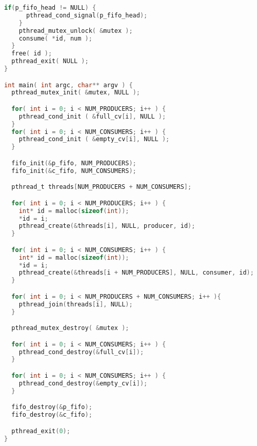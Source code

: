 \begin{lstlisting}[language=C]
    if(p_fifo_head != NULL) {
      pthread_cond_signal(p_fifo_head);
    }
    pthread_mutex_unlock( &mutex );
    consume( *id, num );
  }
  free( id );
  pthread_exit( NULL );
}

int main( int argc, char** argv ) {
  pthread_mutex_init( &mutex, NULL );

  for( int i = 0; i < NUM_PRODUCERS; i++ ) {
    pthread_cond_init ( &full_cv[i], NULL );
  }
  for( int i = 0; i < NUM_CONSUMERS; i++ ) {
    pthread_cond_init ( &empty_cv[i], NULL );
  }

  fifo_init(&p_fifo, NUM_PRODUCERS);
  fifo_init(&c_fifo, NUM_CONSUMERS);

  pthread_t threads[NUM_PRODUCERS + NUM_CONSUMERS];

  for( int i = 0; i < NUM_PRODUCERS; i++ ) {
    int* id = malloc(sizeof(int));
    *id = i;
    pthread_create(&threads[i], NULL, producer, id);
  }

  for( int i = 0; i < NUM_CONSUMERS; i++ ) {
    int* id = malloc(sizeof(int));
    *id = i;
    pthread_create(&threads[i + NUM_PRODUCERS], NULL, consumer, id);
  }

  for( int i = 0; i < NUM_PRODUCERS + NUM_CONSUMERS; i++ ){
    pthread_join(threads[i], NULL);
  }

  pthread_mutex_destroy( &mutex );

  for( int i = 0; i < NUM_CONSUMERS; i++ ) {
    pthread_cond_destroy(&full_cv[i]);
  }

  for( int i = 0; i < NUM_CONSUMERS; i++ ) {
    pthread_cond_destroy(&empty_cv[i]);
  }

  fifo_destroy(&p_fifo);
  fifo_destroy(&c_fifo);

  pthread_exit(0);
}
\end{lstlisting}






